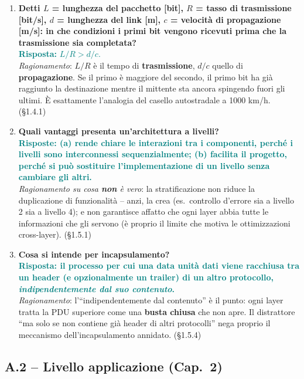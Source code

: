 \documentclass[12pt, a4paper]{article}
\begin{document}
\begin{enumerate}[leftmargin=*]
\item \textbf{Detti $L$ = lunghezza del pacchetto [bit], $R$ = tasso di trasmissione [bit/s], $d$ = lunghezza del link [m], $c$ = velocità di propagazione [m/s]: in che condizioni i primi bit vengono ricevuti prima che la trasmissione sia completata?}\\
\textcolor{teal}{\textbf{Risposta: } $L/R > d/c$.}\\
\textit{Ragionamento}: $L/R$ è il tempo di \textbf{trasmissione}, $d/c$ quello di \textbf{propagazione}. Se il primo è maggiore del secondo, il primo bit ha già raggiunto la destinazione mentre il mittente sta ancora spingendo fuori gli ultimi. È esattamente l'analogia del casello autostradale a 1000 km/h. (\S1.4.1)

\item \textbf{Quali vantaggi presenta un'architettura a livelli?}\\
\textcolor{teal}{\textbf{Risposte: (a) rende chiare le interazioni tra i componenti, perché i livelli sono interconnessi sequenzialmente; (b) facilita il progetto, perché si può sostituire l'implementazione di un livello senza cambiare gli altri.}}\\
\textit{Ragionamento su cosa \textbf{non} è vero}: la stratificazione \textcolor{red!70!black}{non} riduce la duplicazione di funzionalità -- anzi, la crea (es.\ controllo d'errore sia a livello 2 sia a livello 4); e \textcolor{red!70!black}{non} garantisce affatto che ogni layer abbia tutte le informazioni che gli servono (è proprio il limite che motiva le ottimizzazioni cross-layer). (\S1.5.1)

\item \textbf{Cosa si intende per incapsulamento?}\\
\textcolor{teal}{\textbf{Risposta: il processo per cui una data unità dati viene racchiusa tra un header (e opzionalmente un trailer) di un altro protocollo, \emph{indipendentemente dal suo contenuto}.}}\\
\textit{Ragionamento}: l'``indipendentemente dal contenuto'' è il punto: ogni layer tratta la PDU superiore come una \textbf{busta chiusa} che non apre. Il distrattore ``ma solo se non contiene già header di altri protocolli'' nega proprio il meccanismo dell'incapsulamento annidato. (\S1.5.4)

\end{enumerate}

\subsection*{A.2 -- Livello applicazione (Cap.\ 2)}
\end{document}

